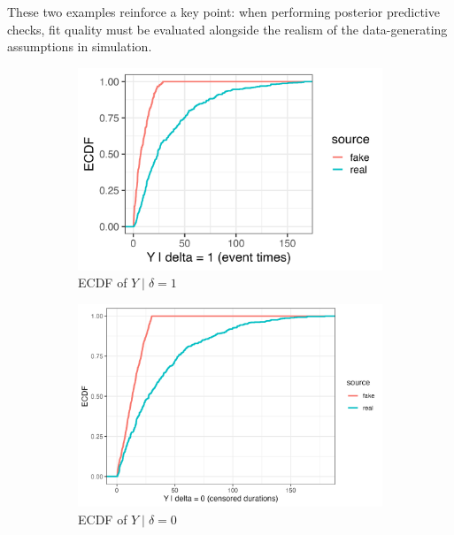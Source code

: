These two examples reinforce a key point: when performing posterior predictive checks, fit quality must be evaluated alongside the realism of the data-generating assumptions in simulation.
\begin{figure}[htbp]
\centering
\begin{subfigure}[t]{0.3\textwidth}
  \centering
  \includegraphics[width=\linewidth]{images/ppc_event_ecdf_A30.png}  %
  \caption{ECDF of $Y \mid \delta=1$}
  \label{fig:ecdf-event_a30}
\end{subfigure}\hfill
\begin{subfigure}[t]{0.3\textwidth}
  \centering
  \includegraphics[width=\linewidth]{images/ppc_censored_ecdf_A30.png}   
  \caption{ECDF of $Y \mid \delta=0$}
  \label{fig:ecdf-cens_a30}
\end{subfigure}\hfill
\begin{subfigure}[t]{0.37\textwidth}
  \centering

\end{subfigure}
\end{figure}
